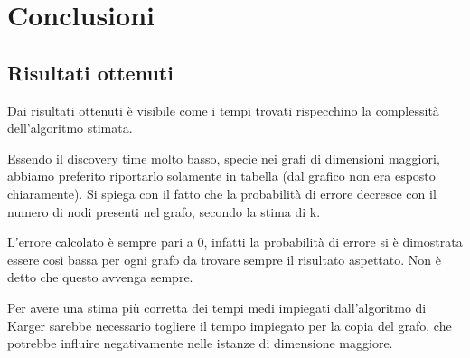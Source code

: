\chapter{Conclusioni\label{sec:conclusioni}}

\section{Risultati ottenuti\label{sec:risultati-ottenuti}}
Dai risultati ottenuti è visibile come i tempi trovati rispecchino la complessità dell'algoritmo stimata.

Essendo il discovery time molto basso, specie nei grafi di dimensioni maggiori, abbiamo preferito riportarlo solamente in tabella (dal grafico non era esposto chiaramente).
Si spiega con il fatto che la probabilità di errore decresce con il numero di nodi presenti nel grafo, secondo la stima di k.

L'errore calcolato è sempre pari a 0, infatti la probabilità di errore si è dimostrata essere così bassa per ogni grafo da trovare sempre il risultato aspettato. Non è detto che questo avvenga sempre.

Per avere una stima più corretta dei tempi medi impiegati dall'algoritmo di Karger sarebbe necessario togliere il tempo impiegato per la copia del grafo, che potrebbe influire negativamente nelle istanze di dimensione maggiore.